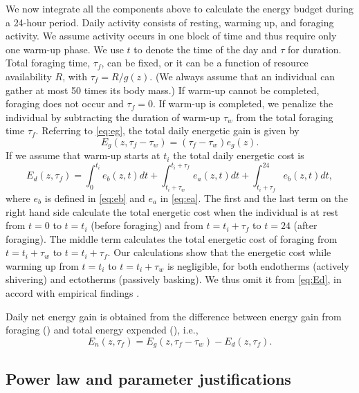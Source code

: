 We now integrate all the components above to calculate the energy budget during a 24-hour period.
Daily activity consists of resting, warming up, and foraging activity.
We assume activity occurs in one block of time and thus require only one warm-up phase.
We use $t$ to denote the time of the day and $\tau$ for duration.
Total foraging time, $\tau_f$, can be fixed, or it can be a function of resource availability $R$, with $\tau_f = R/g(z)$.
(We always assume that an individual can gather at most 50 times its body mass.)
If warm-up cannot be completed, foraging does not occur and $\tau_f = 0$.
If warm-up is completed, we penalize the individual by subtracting the duration of warm-up $\tau_w$ from the total foraging time $\tau_f$.
Referring to \cref{eq:eg}, the total daily energetic gain is given by
\begin{equation} \label{eq:Eg}
	E_g(z,\tau_f - \tau_w) = (\tau_f - \tau_w) e_g(z).
\end{equation}
If we assume that warm-up starts at $t_i$ the total daily energetic cost is
\begin{equation} \label{eq:Ed}
	E_d(z, \tau_f) = \int_0^{t_i} e_b(z, t) dt + \int_{t_i + \tau_w}^{t_i + \tau_f } e_a(z,t) dt + \int_{t_i+\tau_f}^{24} e_b(z, t) dt,
\end{equation}
where $e_b$ is defined in \cref{eq:eb}  and $e_a$ in \cref{eq:ea}.
The first and the last term on the right hand side calculate the total energetic cost when the individual is at rest from $t = 0$ to $t = t_i$ (before foraging) and from $t = t_i + \tau_f$ to $t = 24$ (after foraging).
The middle term calculates the total energetic cost of foraging from $t = t_i + \tau_w$ to $t = t_i + \tau_f$.
Our calculations show that the energetic cost while warming up from $t = t_i$ to $t = t_i + \tau_w$ is negligible, for both endotherms (actively shivering) and ectotherms (passively basking).
We thus omit it from \cref{eq:Ed}, in accord with empirical findings \citep{Heinrich1975}.

Daily net energy gain is obtained from the difference between energy gain from foraging () and total energy expended (), i.e.,
\[
	E_n(z, \tau_f) = E_g(z,\tau_f- \tau_w) - E_d(z, \tau_f).
\]

\subsection*{Power law and parameter justifications}

